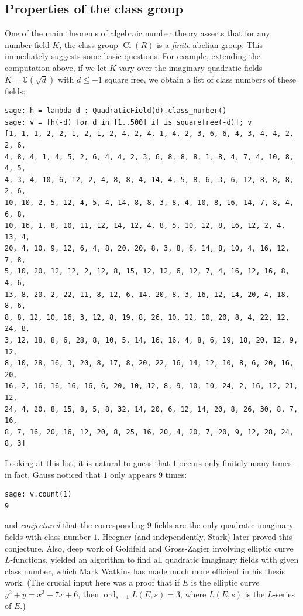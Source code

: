 \documentclass{book}
\theoremstyle{plain}
\theoremstyle{definition}
\numberwithin{equation}{section}
\numberwithin{figure}{section}
\numberwithin{table}{section}
\DeclareMathOperator{\Cl}{Cl}
\DeclareMathOperator{\ord}{ord}
\newcommand{\Q}{\mathbb{Q}}
\begin{document}
\subsection{Properties of the class group}
One of the main theorems of algebraic number theory asserts that
for any number field $K$, the class group $\Cl(R)$ is a {\em finite}
abelian group.   This immediately suggests some basic questions.
For example, extending the computation above,
if we let $K$ vary over the imaginary quadratic fields
$K=\Q(\sqrt{d})$ with $d\leq -1$ square free, we obtain
a list of class numbers of these fields:
\begin{lstlisting}
sage: h = lambda d : QuadraticField(d).class_number()
sage: v = [h(-d) for d in [1..500] if is_squarefree(-d)]; v
[1, 1, 1, 2, 2, 1, 2, 1, 2, 4, 2, 4, 1, 4, 2, 3, 6, 6, 4, 3, 4, 4, 2, 2, 6,
4, 8, 4, 1, 4, 5, 2, 6, 4, 4, 2, 3, 6, 8, 8, 8, 1, 8, 4, 7, 4, 10, 8, 4, 5,
4, 3, 4, 10, 6, 12, 2, 4, 8, 8, 4, 14, 4, 5, 8, 6, 3, 6, 12, 8, 8, 8, 2, 6,
10, 10, 2, 5, 12, 4, 5, 4, 14, 8, 8, 3, 8, 4, 10, 8, 16, 14, 7, 8, 4, 6, 8,
10, 16, 1, 8, 10, 11, 12, 14, 12, 4, 8, 5, 10, 12, 8, 16, 12, 2, 4, 13, 4,
20, 4, 10, 9, 12, 6, 4, 8, 20, 20, 8, 3, 8, 6, 14, 8, 10, 4, 16, 12, 7, 8,
5, 10, 20, 12, 12, 2, 12, 8, 15, 12, 12, 6, 12, 7, 4, 16, 12, 16, 8, 4, 6,
13, 8, 20, 2, 22, 11, 8, 12, 6, 14, 20, 8, 3, 16, 12, 14, 20, 4, 18, 8, 6,
8, 8, 12, 10, 16, 3, 12, 8, 19, 8, 26, 10, 12, 10, 20, 8, 4, 22, 12, 24, 8,
3, 12, 18, 8, 6, 28, 8, 10, 5, 14, 16, 16, 4, 8, 6, 19, 18, 20, 12, 9, 12,
8, 10, 28, 16, 3, 20, 8, 17, 8, 20, 22, 16, 14, 12, 10, 8, 6, 20, 16, 20,
16, 2, 16, 16, 16, 16, 6, 20, 10, 12, 8, 9, 10, 10, 24, 2, 16, 12, 21, 12,
24, 4, 20, 8, 15, 8, 5, 8, 32, 14, 20, 6, 12, 14, 20, 8, 26, 30, 8, 7, 16,
8, 7, 16, 20, 16, 12, 20, 8, 25, 16, 20, 4, 20, 7, 20, 9, 12, 28, 24, 8, 3]
\end{lstlisting}
Looking at this list, it is natural to guess that $1$ occurs only finitely
many times -- in fact, Gauss noticed that $1$ only appears 9 times:
\begin{lstlisting}
sage: v.count(1)
9
\end{lstlisting}
and {\em conjectured} that the corresponding $9$ fields are the only
quadratic imaginary fields with class number $1$.
Heegner (and independently, Stark) later proved this conjecture.
Also, deep work of Goldfeld and Gross-Zagier involving elliptic
curve $L$-functions, yielded an algorithm to find all quadratic
imaginary fields with given class number, which Mark Watkins has made
much more efficient in his thesis work.  (The crucial input here
was a proof that if $E$ is the elliptic curve $y^2 + y = x^3 - 7x + 6$,
then $\ord_{s=1}L(E,s)=3$, where $L(E,s)$ is the $L$-series
of $E$.)
\end{document}
